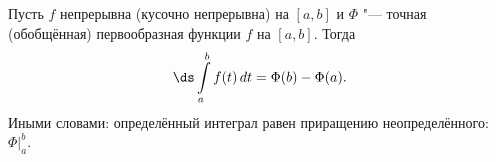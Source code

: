 
    	Пусть $f$ непрерывна (кусочно непрерывна) на $[a,b]$ и $\Phi$ "--- точная (обобщённая) первообразная
    	функции $f$ на $[a,b]$. Тогда \[\ds\int\limits_a^bf(t)\,dt=\Phi(b)-\Phi(a).\]
    	Иными словами: определённый интеграл равен приращению неопределённого: $\Phi\big|_a^b$.
    